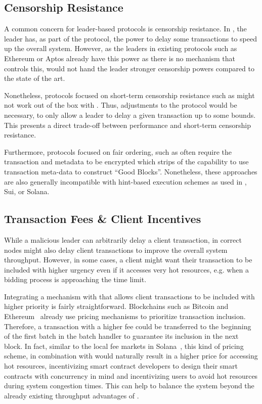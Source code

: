 \subsection{Censorship Resistance}

A common concern for leader-based protocols is censorship resistance. In \sys, the leader has, as part of the protocol, the power to delay some transactions to speed up the overall system. 
However, as the leaders in existing protocols such as Ethereum or Aptos already have this power as there is no mechanism that controls this, \sys would not hand the leader stronger censorship powers compared to the state of the art. 

Nonetheless, protocols focused on short-term censorship resistance such as \cite{xue2023bigdipper} might not work out of the box with \sys.
Thus, adjustments to the protocol would be necessary, to only allow a leader to delay a given transaction up to some bounds.
This presents a direct trade-off between performance and short-term censorship resistance. 

Furthermore, protocols focused on fair ordering, such as \cite{8526804} often require the transaction and metadata to be encrypted which strips \sys of the capability to use transaction meta-data to construct ``Good Blocks''. Nonetheless, these approaches are also generally incompatible with hint-based execution schemes as used in \basesys, Sui, or Solana.

\subsection{Transaction Fees \& Client Incentives}

While a malicious leader can arbitrarily delay a client transaction, in \sys correct nodes might also delay client transactions to improve the overall system throughput. However, in some cases, a client might want their transaction to be included with higher urgency even if it accesses very hot resources, e.g. when a bidding process is approaching the time limit.

Integrating a mechanism with \sys that allows client transactions to be included with higher priority is fairly straightforward. Blockchains such as Bitcoin and Ethereum~\cite{bitcoin,ethereum} already use pricing mechanisms to prioritize transaction inclusion. Therefore, a transaction with a higher fee could be transferred to the beginning of the first batch in the batch handler to guarantee its inclusion in the next block.
In fact, similar to the local fee markets in Solana~\cite{solana}, this kind of pricing scheme, in combination with \sys would naturally result in a higher price for accessing hot resources, incentivizing smart contract developers to design their smart contracts with concurrency in mind and incentivizing users to avoid hot resources during system congestion times. This can help to balance the system beyond the already existing throughput advantages of \sys.